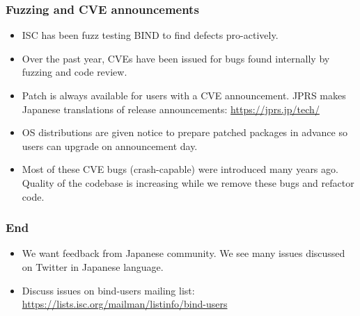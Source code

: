 \documentclass[aspectratio=169,14pt]{beamer}
\begin{document}
\frame
{
  \frametitle{Fuzzing and CVE announcements}

  \begin{itemize}

  \item ISC has been fuzz testing BIND to find defects pro-actively.

  \item Over the past year, CVEs have been issued for bugs found
    internally by fuzzing and code review.

  \item Patch is always available for users with a CVE
    announcement. JPRS makes Japanese translations of release
    announcements: \url{https://jprs.jp/tech/}

  \item OS distributions are given notice to prepare patched packages in
    advance so users can upgrade on announcement day.

  \item Most of these CVE bugs (crash-capable) were introduced many
    years ago. Quality of the codebase is increasing while we remove
    these bugs and refactor code.

  \end{itemize}

}

\frame
{
  \frametitle{End}

  \begin{itemize}

  \item We want feedback from Japanese community. We see many issues
    discussed on Twitter in Japanese language.

  \item Discuss issues on bind-users mailing list:
    \url{https://lists.isc.org/mailman/listinfo/bind-users}

  \end{itemize}

}
\end{document}
